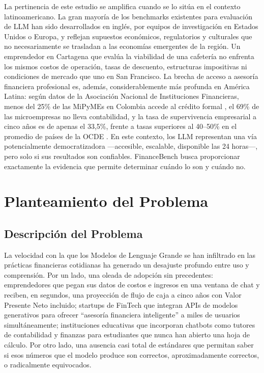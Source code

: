 \documentclass[12pt,a4paper]{article}
\begin{document}
La pertinencia de este estudio se amplifica cuando se lo sitúa en el contexto latinoamericano. La gran mayoría de los benchmarks existentes para evaluación de LLM han sido desarrollados en inglés, por equipos de investigación en Estados Unidos o Europa, y reflejan supuestos económicos, regulatorios y culturales que no necesariamente se trasladan a las economías emergentes de la región. Un emprendedor en Cartagena que evalúa la viabilidad de una cafetería no enfrenta los mismos costos de operación, tasas de descuento, estructuras impositivas ni condiciones de mercado que uno en San Francisco. La brecha de acceso a asesoría financiera profesional es, además, considerablemente más profunda en América Latina: según datos de la Asociación Nacional de Instituciones Financieras, menos del 25\% de las MiPyMEs en Colombia accede al crédito formal \citep{ANIF2024}, el 69\% de las microempresas no lleva contabilidad, y la tasa de supervivencia empresarial a cinco años es de apenas el 33,5\%, frente a tasas superiores al 40--50\% en el promedio de países de la OCDE \citep{Confecamaras2023}. En este contexto, los LLM representan una vía potencialmente democratizadora ---accesible, escalable, disponible las 24 horas---, pero solo si sus resultados son confiables. FinanceBench busca proporcionar exactamente la evidencia que permite determinar cuándo lo son y cuándo no.

\section{Planteamiento del Problema}\label{sec:planteamiento}

\subsection{Descripción del Problema}

La velocidad con la que los Modelos de Lenguaje Grande se han infiltrado en las prácticas financieras cotidianas ha generado un desajuste profundo entre uso y comprensión. Por un lado, una oleada de adopción sin precedentes: emprendedores que pegan sus datos de costos e ingresos en una ventana de chat y reciben, en segundos, una proyección de flujo de caja a cinco años con Valor Presente Neto incluido; startups de FinTech que integran APIs de modelos generativos para ofrecer ``asesoría financiera inteligente'' a miles de usuarios simultáneamente; instituciones educativas que incorporan chatbots como tutores de contabilidad y finanzas para estudiantes que nunca han abierto una hoja de cálculo. Por otro lado, una ausencia casi total de estándares que permitan saber si esos números que el modelo produce son correctos, aproximadamente correctos, o radicalmente equivocados.
\end{document}
